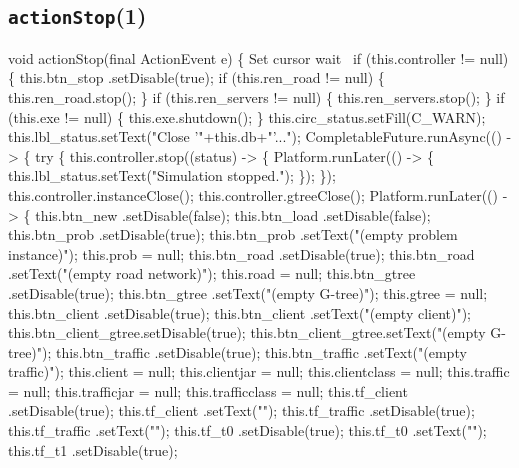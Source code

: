 \subsection{\texttt{actionStop}(1)}
\nwenddocs{}\endmoddef{}
void actionStop(final ActionEvent e) \{
  \LA{}Set cursor wait~{\nwtagstyle{}}\RA{}
  if (this.controller != null) \{
    this.btn_stop     .setDisable(true);
    if (this.ren_road != null) \{
      this.ren_road.stop();
    \}
    if (this.ren_servers != null) \{
      this.ren_servers.stop();
    \}
    if (this.exe != null) \{
      this.exe.shutdown();
    \}
    this.circ_status.setFill(C_WARN);
    this.lbl_status.setText("Close '"+this.db+"'...");
    CompletableFuture.runAsync(() -> \{
      try \{
        this.controller.stop((status) -> \{
          Platform.runLater(() -> \{
            this.lbl_status.setText("Simulation stopped.");
          \});
        \});
        this.controller.instanceClose();
        this.controller.gtreeClose();
        Platform.runLater(() -> \{
          this.btn_new      .setDisable(false);
          this.btn_load     .setDisable(false);
          this.btn_prob     .setDisable(true);
          this.btn_prob     .setText("(empty problem instance)");
          this.prob = null;
          this.btn_road     .setDisable(true);
          this.btn_road     .setText("(empty road network)");
          this.road = null;
          this.btn_gtree    .setDisable(true);
          this.btn_gtree    .setText("(empty G-tree)");
          this.gtree = null;
          this.btn_client   .setDisable(true);
          this.btn_client   .setText("(empty client)");
          this.btn_client_gtree.setDisable(true);
          this.btn_client_gtree.setText("(empty G-tree)");
          this.btn_traffic  .setDisable(true);
          this.btn_traffic  .setText("(empty traffic)");
          this.client = null;
          this.clientjar = null;
          this.clientclass = null;
          this.traffic = null;
          this.trafficjar = null;
          this.trafficclass = null;
          this.tf_client    .setDisable(true);
          this.tf_client    .setText("");
          this.tf_traffic   .setDisable(true);
          this.tf_traffic   .setText("");
          this.tf_t0        .setDisable(true);
          this.tf_t0        .setText("");
          this.tf_t1        .setDisable(true);
